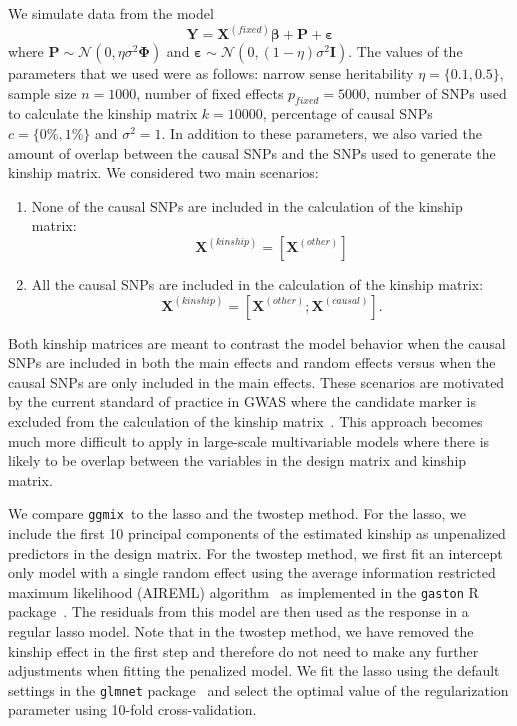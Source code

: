 \documentclass[12pt,letter]{article}\usepackage[]{graphicx}\usepackage[]{color}
\newcommand{\bX}{\textbf{X}}
\newcommand{\bY}{\textbf{Y}}
\newcommand{\ggmix}{\texttt{ggmix}}
\newcommand{\bI}{\textbf{I}}
\newcommand{\be}{\boldsymbol{\varepsilon}}
\newcommand{\bbeta}{\boldsymbol{\beta}}
\newcommand{\bPhi}{\boldsymbol{\Phi}}
\begin{document}
We simulate data from the model
\begin{equation}
	\bY = \bX^{(fixed)} \bbeta + \mathbf{P} + \be
\end{equation}
where $\mathbf{P}\sim \mathcal{N}(0, \eta \sigma^2 \bPhi)$ and $\be \sim \mathcal{N}(0, (1-\eta) \sigma^2 \bI)$. The values of the parameters that we used were as follows: narrow sense heritability $\eta=\lbrace 0.1, 0.5 \rbrace$, sample size $n=1000$, number of fixed effects $p_{fixed} = 5000$, number of SNPs used to calculate the kinship matrix $k = 10000$, percentage of causal SNPs $c=\lbrace 0\%, 1\%\rbrace$ and $\sigma^2 = 1$. In addition to these parameters, we also varied the amount of overlap between the causal SNPs and the SNPs used to generate the kinship matrix. We considered two main scenarios:
\begin{enumerate}
\item None of the causal SNPs are included in the calculation of the kinship matrix: $$\bX^{(kinship)} = \left[\bX^{(other)} \right]$$
\item All the causal SNPs are included in the calculation of the kinship matrix: $$\bX^{(kinship)} = \left[\bX^{(other)} ; \bX^{(causal)}\right].$$
\end{enumerate}
Both kinship matrices are meant to contrast the model behavior when the causal SNPs are included in both the main effects and random effects versus when the causal SNPs are only included in the main effects.
These scenarios are motivated by the current standard of practice in GWAS where the candidate marker is excluded from the calculation of the kinship matrix~\citep{lippert2011fast}.
This approach becomes much more difficult to apply in large-scale multivariable models where there is likely to be overlap between the variables in the design matrix and kinship matrix.

We compare \ggmix ~to the lasso and the twostep method. For the lasso, we include the first 10 principal components of the estimated kinship as unpenalized predictors in the design matrix. For the twostep method, we first fit an intercept only model with a single random effect using the average information restricted maximum likelihood (AIREML) algorithm~\citep{gilmour1995average} as implemented in the \texttt{gaston} R package~\citep{gaston}. The residuals from this model are then used as the response in a regular lasso model. Note that in the twostep method, we have removed the kinship effect in the first step and therefore do not need to make any further adjustments when fitting the penalized model. We fit the lasso using the default settings in the \texttt{glmnet} package~\citep{friedman2010regularization} and select the optimal value of the regularization parameter using 10-fold cross-validation.
\end{document}
